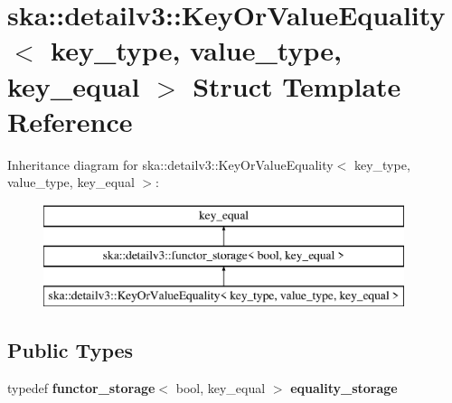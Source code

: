 \section{ska\+:\+:detailv3\+:\+:Key\+Or\+Value\+Equality$<$ key\+\_\+type, value\+\_\+type, key\+\_\+equal $>$ Struct Template Reference}
\label{structska_1_1detailv3_1_1KeyOrValueEquality}
Inheritance diagram for ska\+:\+:detailv3\+:\+:Key\+Or\+Value\+Equality$<$ key\+\_\+type, value\+\_\+type, key\+\_\+equal $>$\+:\begin{figure}[H]
\begin{center}
\leavevmode
\includegraphics[height=3.000000cm]{structska_1_1detailv3_1_1KeyOrValueEquality}
\end{center}
\end{figure}
\subsection*{Public Types}
\begin{DoxyCompactItemize}
\item 
typedef {\bf functor\+\_\+storage}$<$ bool, key\+\_\+equal $>$ {\bfseries equality\+\_\+storage}\label{structska_1_1detailv3_1_1KeyOrValueEquality_ada804457efc64bb51a705877f6b029d3}

\end{DoxyCompactItemize}
